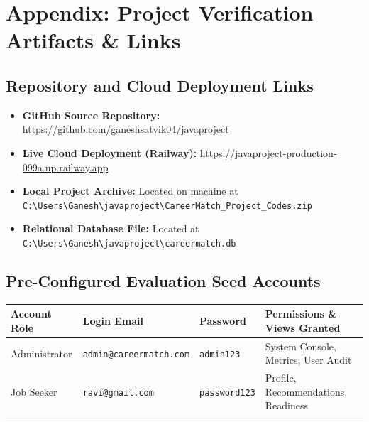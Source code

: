 \documentclass[11pt,a4paper]{report}
\begin{document}
\newpage
\chapter*{Appendix: Project Verification Artifacts \& Links}

\section*{Repository and Cloud Deployment Links}
\begin{itemize}
    \item \textbf{GitHub Source Repository:} \href{https://github.com/ganeshsatvik04/javaproject}{https://github.com/ganeshsatvik04/javaproject}
    \item \textbf{Live Cloud Deployment (Railway):} \href{https://javaproject-production-099a.up.railway.app}{https://javaproject-production-099a.up.railway.app}
    \item \textbf{Local Project Archive:} Located on machine at \texttt{C:\textbackslash Users\textbackslash Ganesh\textbackslash javaproject\textbackslash CareerMatch\_Project\_Codes.zip}
    \item \textbf{Relational Database File:} Located at \texttt{C:\textbackslash Users\textbackslash Ganesh\textbackslash javaproject\textbackslash careermatch.db}
\end{itemize}

\section*{Pre-Configured Evaluation Seed Accounts}
\begin{table}[H]
    \centering
    \begin{tabular}{llll}
        \toprule
        \textbf{Account Role} & \textbf{Login Email} & \textbf{Password} & \textbf{Permissions \& Views Granted} \\
        \midrule
        Administrator & \texttt{admin@careermatch.com} & \texttt{admin123} & System Console, Metrics, User Audit \\
        Job Seeker & \texttt{ravi@gmail.com} & \texttt{password123} & Profile, Recommendations, Readiness \\
        \bottomrule
    \end{tabular}
\end{table}
\end{document}
